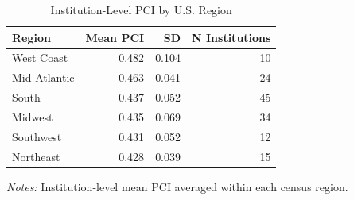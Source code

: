 \begin{table}[H]
\centering
\caption{Institution-Level PCI by U.S. Region}
\label{tab:table11_regional}
\begin{threeparttable}
\small
\begin{tabular}{lrrr}
\toprule
\textbf{Region} & \textbf{Mean PCI} & \textbf{SD} & \textbf{N Institutions} \\
\midrule
West Coast & 0.482 & 0.104 & 10 \\
Mid-Atlantic & 0.463 & 0.041 & 24 \\
South & 0.437 & 0.052 & 45 \\
Midwest & 0.435 & 0.069 & 34 \\
Southwest & 0.431 & 0.052 & 12 \\
Northeast & 0.428 & 0.039 & 15 \\
\bottomrule
\end{tabular}
\begin{tablenotes}\small
\item \textit{Notes:} Institution-level mean PCI averaged within each census region.
\end{tablenotes}
\end{threeparttable}
\end{table}